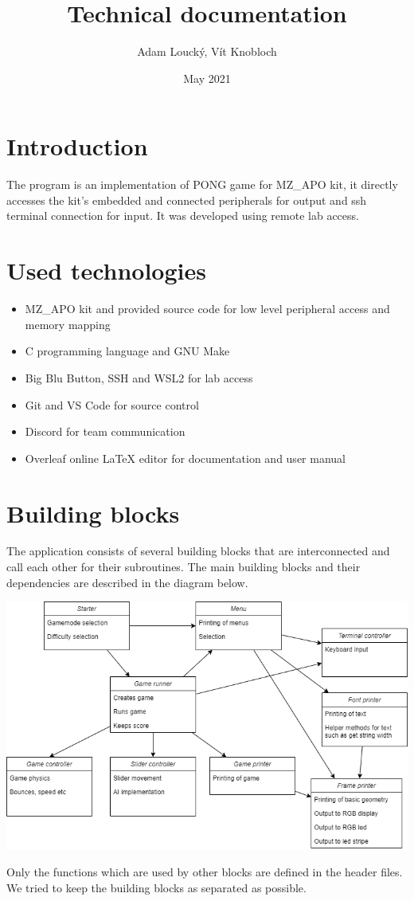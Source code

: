 \documentclass{article}
\title{Technical documentation}
\author{Adam Loucký, Vít Knobloch}
\date{May 2021}
\begin{document}
\maketitle

\section{Introduction}
The program is an implementation of PONG game for MZ\_APO kit, it directly accesses the kit's embedded and connected peripherals for output and ssh terminal connection for input. It was developed using remote lab access.

\section{Used technologies}

\begin{itemize}
    \item MZ\_APO kit and provided source code for low level peripheral access and memory mapping
    \item C programming language and GNU Make
    \item Big Blu Button, SSH and WSL2 for lab access
    \item Git and VS Code for source control
    \item Discord for team communication
    \item Overleaf online LaTeX editor for documentation and user manual
\end{itemize}

\section{Building blocks}
The application consists of several building blocks that are interconnected and call each other for their subroutines. The main building blocks and their dependencies are described in the diagram below.
\begin{center}
\includegraphics[width=\textwidth]{tech_blocks.png}    
\end{center}
Only the functions which are used by other blocks are defined in the header files. We tried to keep the building blocks as separated as possible.
\end{document}
